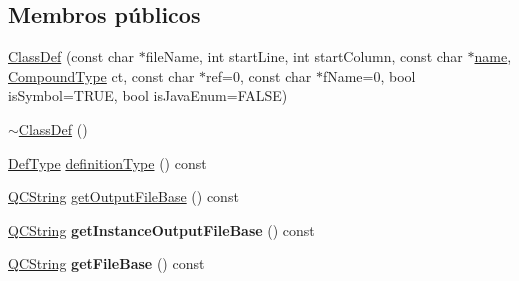 \subsection*{Membros públicos}
\begin{DoxyCompactItemize}
\item 
\hyperlink{class_class_def_a389341b271ebaf30cccddd1838c0f597}{Class\-Def} (const char $\ast$file\-Name, int start\-Line, int start\-Column, const char $\ast$\hyperlink{class_definition_a2c310e06c9aadc6fb218f80fcbb5c695}{name}, \hyperlink{class_class_def_a768a6f0a6fd7e9087ff7971abbcc3f36}{Compound\-Type} ct, const char $\ast$ref=0, const char $\ast$f\-Name=0, bool is\-Symbol=T\-R\-U\-E, bool is\-Java\-Enum=F\-A\-L\-S\-E)
\item 
\hyperlink{class_class_def_a0da78b18aa5068125435320465f36e31}{$\sim$\-Class\-Def} ()
\item 
\hyperlink{class_definition_intf_a2dc566dfec40397b2990e6520536ecb5}{Def\-Type} \hyperlink{class_class_def_aac410235a8bf90e471e649bd9dbf9c5e}{definition\-Type} () const 
\item 
\hyperlink{class_q_c_string}{Q\-C\-String} \hyperlink{class_class_def_af72a982ba8198cd5c98e9fc850b71df6}{get\-Output\-File\-Base} () const 
\item 
\hypertarget{class_class_def_a765bb682fdbd4e43d815fad3710f10c5}{\hyperlink{class_q_c_string}{Q\-C\-String} {\bfseries get\-Instance\-Output\-File\-Base} () const }\label{class_class_def_a765bb682fdbd4e43d815fad3710f10c5}

\item 
\hypertarget{class_class_def_ad47efa4da31f60e593a236751d7e4733}{\hyperlink{class_q_c_string}{Q\-C\-String} {\bfseries get\-File\-Base} () const }\label{class_class_def_ad47efa4da31f60e593a236751d7e4733}


\end{DoxyCompactItemize}
